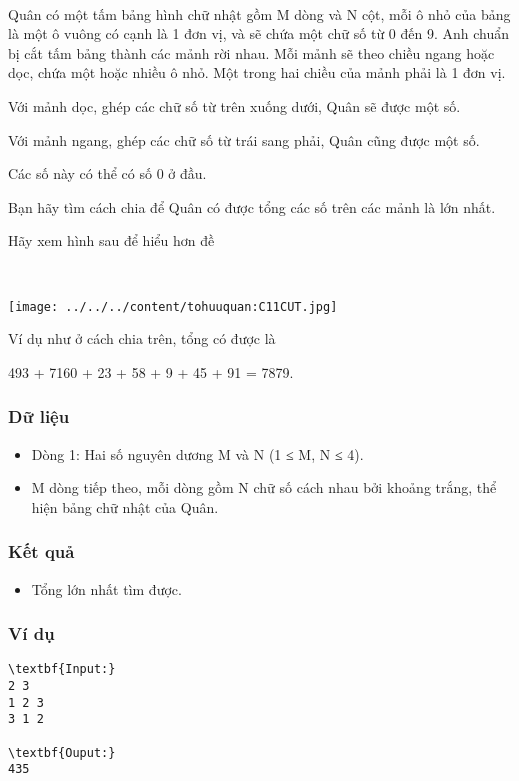 

 

Quân có một tấm bảng hình chữ nhật gồm M dòng và N cột, mỗi ô nhỏ của bảng là một ô vuông có cạnh là 1 đơn vị, và sẽ chứa một chữ số từ 0 đến 9. Anh chuẩn bị cắt tấm bảng thành các mảnh rời nhau. Mỗi mảnh sẽ theo chiều ngang hoặc dọc, chứa một hoặc nhiều ô nhỏ. Một trong hai chiều của mảnh phải là 1 đơn vị.

Với mảnh dọc, ghép các chữ số từ trên xuống dưới, Quân sẽ được một số.


Với mảnh ngang, ghép các chữ số từ trái sang phải, Quân cũng được một số.


Các số này có thể có số 0 ở đầu.

Bạn hãy tìm cách chia để Quân có được tổng các số trên các mảnh là lớn nhất.

Hãy xem hình sau để hiểu hơn đề

 


\texttt{[image: ../../../content/tohuuquan:C11CUT.jpg]}

Ví dụ như ở cách chia trên, tổng có được là


493 + 7160 + 23 + 58 + 9 + 45 + 91 = 7879.

\subsubsection{Dữ liệu}
\begin{itemize}
	\item Dòng 1: Hai số nguyên dương M và N (1 ≤ M, N ≤ 4).
	\item M dòng tiếp theo, mỗi dòng gồm N chữ số cách nhau bởi khoảng trắng, thể hiện bảng chữ nhật của Quân.
\end{itemize}

\subsubsection{Kết quả}
\begin{itemize}
	\item Tổng lớn nhất tìm được.
\end{itemize}

\subsubsection{Ví dụ}
\begin{verbatim}
\textbf{Input:}
2 3
1 2 3
3 1 2

\textbf{Ouput:}
435
\end{verbatim}
